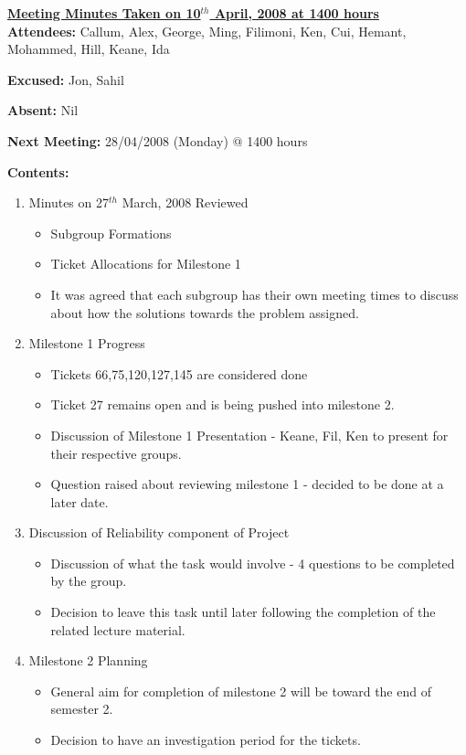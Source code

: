 \documentclass{letter}
\begin{document}
{\large \textbf{\underline{Meeting Minutes Taken on 10$^{th}$ April, 2008 at 1400 hours}}}\\

\textbf{Attendees:} Callum, Alex, George, Ming, Filimoni, Ken, Cui, Hemant, Mohammed, Hill, Keane, Ida 

\textbf{Excused:} Jon, Sahil

\textbf{Absent:} Nil

\textbf{Next Meeting:} 28/04/2008 (Monday) @ 1400 hours

\textbf{Contents:}

\begin{enumerate}
\item Minutes on 27$^{th}$ March, 2008 Reviewed
	\begin{itemize}
	\item Subgroup Formations
	\item Ticket Allocations for Milestone 1
	\item It was agreed that each subgroup has their own meeting times to discuss about how the solutions towards the problem assigned. 
	\end{itemize}
\item Milestone 1 Progress 
	\begin{itemize}
	\item Tickets 66,75,120,127,145 are considered done
	\item Ticket 27 remains open and is being pushed into milestone 2.
	\item Discussion of Milestone 1 Presentation - Keane, Fil, Ken to present for their respective groups.
	\item Question raised about reviewing milestone 1 - decided to be done at a later date.
	\end{itemize}
\item Discussion of Reliability component of Project
	\begin{itemize}
	\item Discussion of what the task would involve - 4 questions to be completed by the group.
	\item Decision to leave this task until later following the completion of the related lecture material.
	\end{itemize}
\item Milestone 2 Planning
	\begin{itemize}
	\item General aim for completion of milestone 2 will be toward the end of semester 2.
	\item Decision to have an investigation period for the tickets.

\end{itemize}
\end{enumerate}
\end{document}
